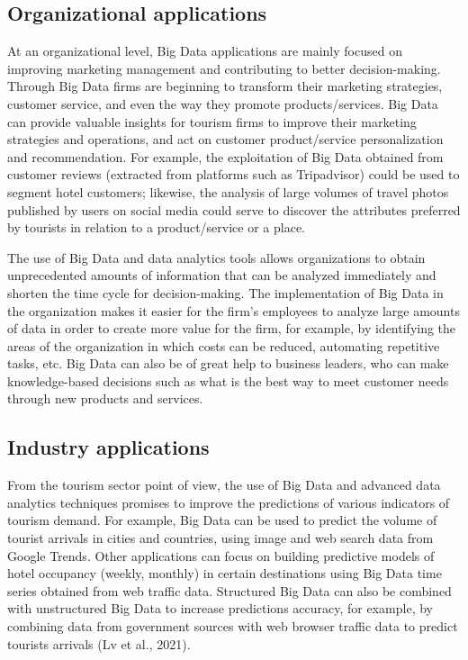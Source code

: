 \documentclass[
  letterpaper,
  DIV=11,
  numbers=noendperiod]{scrreprt}
\begin{document}
\hypertarget{organizational-applications}{%
\subsection{Organizational
applications}\label{organizational-applications}}

At an organizational level, Big Data applications are mainly focused on
improving marketing management and contributing to better
decision-making. Through Big Data firms are beginning to transform their
marketing strategies, customer service, and even the way they promote
products/services. Big Data can provide valuable insights for tourism
firms to improve their marketing strategies and operations, and act on
customer product/service personalization and recommendation. For
example, the exploitation of Big Data obtained from customer reviews
(extracted from platforms such as Tripadvisor) could be used to segment
hotel customers; likewise, the analysis of large volumes of travel
photos published by users on social media could serve to discover the
attributes preferred by tourists in relation to a product/service or a
place.

The use of Big Data and data analytics tools allows organizations to
obtain unprecedented amounts of information that can be analyzed
immediately and shorten the time cycle for decision-making. The
implementation of Big Data in the organization makes it easier for the
firm's employees to analyze large amounts of data in order to create
more value for the firm, for example, by identifying the areas of the
organization in which costs can be reduced, automating repetitive tasks,
etc. Big Data can also be of great help to business leaders, who can
make knowledge-based decisions such as what is the best way to meet
customer needs through new products and services.

\hypertarget{industry-applications}{%
\subsection{Industry applications}\label{industry-applications}}

From the tourism sector point of view, the use of Big Data and advanced
data analytics techniques promises to improve the predictions of various
indicators of tourism demand. For example, Big Data can be used to
predict the volume of tourist arrivals in cities and countries, using
image and web search data from Google Trends. Other applications can
focus on building predictive models of hotel occupancy (weekly, monthly)
in certain destinations using Big Data time series obtained from web
traffic data. Structured Big Data can also be combined with unstructured
Big Data to increase predictions accuracy, for example, by combining
data from government sources with web browser traffic data to predict
tourists arrivals (Lv et al., 2021).
\end{document}
